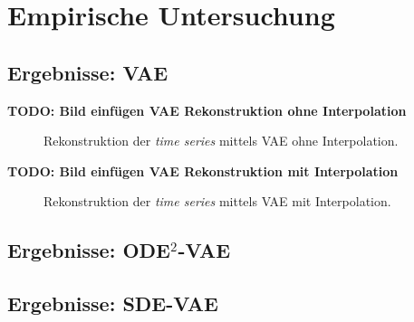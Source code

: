 \documentclass[12pt]{article}
\begin{document}
	
	\section[Empirische Untersuchung]{Empirische Untersuchung}
	\subsection[VAE]{Ergebnisse: VAE}
	
	\textbf{TODO: Bild einfügen VAE Rekonstruktion ohne Interpolation}
	\begin{figure}[!htbp]
		\centering
		\caption{Rekonstruktion der \emph{time series} mittels VAE ohne Interpolation.}
	\end{figure}
	\textbf{TODO: Bild einfügen VAE Rekonstruktion mit Interpolation}
	\begin{figure}[!htbp]
		\centering
		\caption{Rekonstruktion der \emph{time series} mittels VAE mit Interpolation.}
	\end{figure}
	\newpage
	\subsection[ODE$^2$-VAE]{Ergebnisse: ODE$^2$-VAE}
	
	\newpage
	\subsection[SDE-VAE]{Ergebnisse: SDE-VAE}
	\newpage
\end{document}
